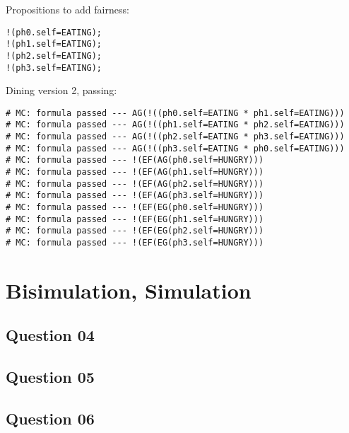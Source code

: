 \documentclass[a4paper]{article}
\begin{document}
Propositions to add fairness:
\begin{lstlisting}
!(ph0.self=EATING);
!(ph1.self=EATING);
!(ph2.self=EATING);
!(ph3.self=EATING);
\end{lstlisting}

Dining version 2, passing:
\begin{lstlisting}
# MC: formula passed --- AG(!((ph0.self=EATING * ph1.self=EATING)))
# MC: formula passed --- AG(!((ph1.self=EATING * ph2.self=EATING)))
# MC: formula passed --- AG(!((ph2.self=EATING * ph3.self=EATING)))
# MC: formula passed --- AG(!((ph3.self=EATING * ph0.self=EATING)))
# MC: formula passed --- !(EF(AG(ph0.self=HUNGRY)))
# MC: formula passed --- !(EF(AG(ph1.self=HUNGRY)))
# MC: formula passed --- !(EF(AG(ph2.self=HUNGRY)))
# MC: formula passed --- !(EF(AG(ph3.self=HUNGRY)))
# MC: formula passed --- !(EF(EG(ph0.self=HUNGRY)))
# MC: formula passed --- !(EF(EG(ph1.self=HUNGRY)))
# MC: formula passed --- !(EF(EG(ph2.self=HUNGRY)))
# MC: formula passed --- !(EF(EG(ph3.self=HUNGRY)))
\end{lstlisting}

\section*{Bisimulation, Simulation}

\subsection*{Question 04}

\subsection*{Question 05}

\subsection*{Question 06}
\end{document}
